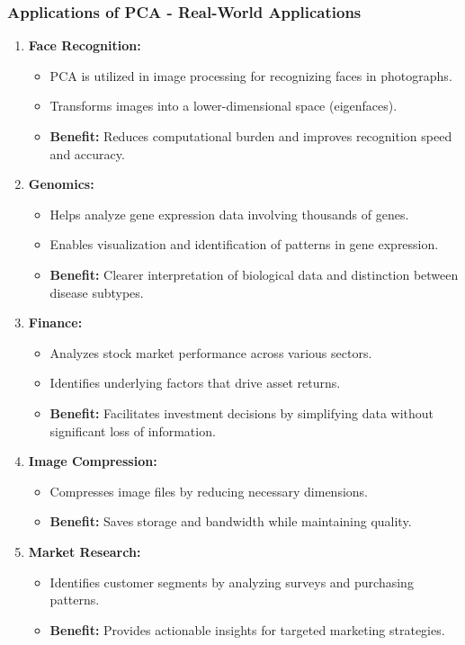 \documentclass[aspectratio=169]{beamer}
\begin{document}
\begin{frame}[fragile]
    \frametitle{Applications of PCA - Real-World Applications}

    \begin{enumerate}
        \item \textbf{Face Recognition:}
        \begin{itemize}
            \item PCA is utilized in image processing for recognizing faces in photographs.
            \item Transforms images into a lower-dimensional space (eigenfaces).
            \item \textbf{Benefit:} Reduces computational burden and improves recognition speed and accuracy.
        \end{itemize}

        \item \textbf{Genomics:}
        \begin{itemize}
            \item Helps analyze gene expression data involving thousands of genes.
            \item Enables visualization and identification of patterns in gene expression.
            \item \textbf{Benefit:} Clearer interpretation of biological data and distinction between disease subtypes.
        \end{itemize}

        \item \textbf{Finance:}
        \begin{itemize}
            \item Analyzes stock market performance across various sectors.
            \item Identifies underlying factors that drive asset returns.
            \item \textbf{Benefit:} Facilitates investment decisions by simplifying data without significant loss of information.
        \end{itemize}

        \item \textbf{Image Compression:}
        \begin{itemize}
            \item Compresses image files by reducing necessary dimensions.
            \item \textbf{Benefit:} Saves storage and bandwidth while maintaining quality.
        \end{itemize}

        \item \textbf{Market Research:}
        \begin{itemize}
            \item Identifies customer segments by analyzing surveys and purchasing patterns.
            \item \textbf{Benefit:} Provides actionable insights for targeted marketing strategies.
        \end{itemize}
    \end{enumerate}
\end{frame}
\end{document}
